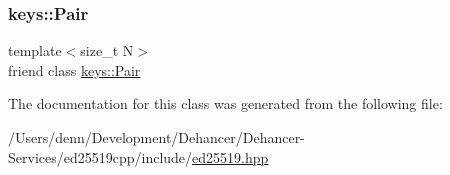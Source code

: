 \subsubsection{\texorpdfstring{keys::Pair}{keys::Pair}}
{\footnotesize\ttfamily template$<$size\+\_\+t N$>$ \\
friend class \mbox{\hyperlink{classed25519_1_1keys_1_1_pair}{keys\+::\+Pair}}\hspace{0.3cm}{\ttfamily [friend]}}



The documentation for this class was generated from the following file\+:\begin{DoxyCompactItemize}
\item 
/\+Users/denn/\+Development/\+Dehancer/\+Dehancer-\/\+Services/ed25519cpp/include/\mbox{\hyperlink{ed25519_8hpp}{ed25519.\+hpp}}\end{DoxyCompactItemize}
